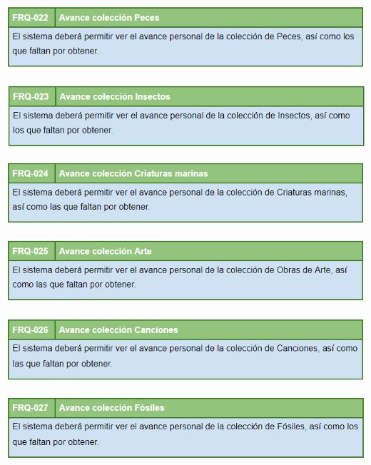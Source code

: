 	\bigskip
	
	\includegraphics[width=\textwidth]{img/cap5/FR/22.png}
	
	\bigskip
	
	\includegraphics[width=\textwidth]{img/cap5/FR/23.png}
	
	\bigskip
	
	\includegraphics[width=\textwidth]{img/cap5/FR/24.png}
	
	\bigskip
	
	\includegraphics[width=\textwidth]{img/cap5/FR/25.png}
	
	\bigskip
	
	\includegraphics[width=\textwidth]{img/cap5/FR/26.png}
	
	\bigskip
	
	\includegraphics[width=\textwidth]{img/cap5/FR/27.png}
	
